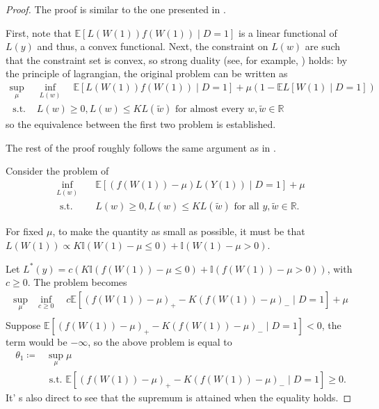 \documentclass[12pt]{article}
\newcommand{\Indc}{\mathbb{I}}
\begin{document}
	\begin{proof}
		The proof is similar to the one presented in \textcite{yadlowsky2018bounds}. 
		
		First, note that $\mathbb{E}[L(W(1))f(W(1)) \mid D=1]$ is a linear functional of $L(y)$ and thus, a convex functional. Next, the constraint on $L(w)$ are such that the constraint set is convex, so strong duality (see, for example, \textcite{luenberger1997optimization}) holds: by the principle of lagrangian, the original problem can be written as
		$$
		\begin{array}{ll}
		\sup_{\mu} & \inf _{L(w)} \quad \mathbb{E}[L(W(1))f(W(1)) \mid D=1] + \mu(1 -  \mathbb{E}L[W(1)\mid D = 1]) \\
		\text { s.t. }  & L(w) \geq 0, L(w) \leq K L(\tilde{w}) \text { for almost every } w, \tilde{w} \in \mathbb{R}
		\end{array}
		$$
		so the equivalence between the first two problem is established.
		
		The rest of the proof roughly follows the same argument as in \textcite{yadlowsky2018bounds}.
		
		Consider the problem of 
		$$
		\begin{array}{ll}
		\inf _{L(w)} & \quad \mathbb{E}[(f(W(1))-\mu) L(Y(1)) \mid D=1]+\mu \\
		\text { s.t. } &\quad L(w) \geq 0, L(w) \leq K L(\tilde{w}) \text { for all } y, \tilde{w} \in \mathbb{R}.
		\end{array}
		$$
		
		For fixed $\mu$, to make the quantity as small as possible, it must be that $L(W(1)) \propto K \Indc(W(1) - \mu \leq 0) + \Indc(W(1) - \mu > 0)$.
		
		Let $L^*(y) = c(K \Indc(f(W(1)) - \mu \leq 0) + \Indc(f(W(1)) - \mu > 0))$, with $c \geq 0$. The problem becomes
		$$
		\begin{array}{ll}
		\sup_{\mu} & \inf _{c \geq 0} \quad c\mathbb{E}\left[(f(W(1))-\mu)_{+}-K(f(W(1))-\mu)_{-} \mid D=1\right] + \mu \\
		\end{array}
		$$
		Suppose $\mathbb{E}\left[(f(W(1))-\mu)_{+}-K(f(W(1))-\mu)_{-} \mid D=1\right] < 0$, the term would be $-\infty$, so the above problem is equal to 
		\begin{equation*}
		\begin{array}{ll}
		\theta_1 \coloneqq & \sup _{\mu}  \mu \\
		& \text { s.t. }  \mathbb{E}\left[(f(W(1))-\mu)_{+}-K(f(W(1))-\mu)_{-} \mid D=1\right] \geq 0.
		\end{array}
		\end{equation*}
		It' s also direct to see that the supremum is attained when the equality holds.
	\end{proof}
\end{document}
